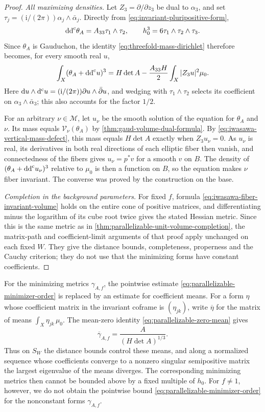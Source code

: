 \begin{proof}
\emph{All maximizing densities.}
Let $Z_3=\partial/\partial z_3$ be dual to $\alpha_3$, and set $\tau_j=(\mathrm i/(2\pi))\alpha_j\wedge\bar\alpha_j$. Directly from \eqref{eq:invariant-pluripositive-form},
\[
 \mathrm{dd}^{\mathrm{c}}\theta_A=A_{33}\tau_1\wedge\tau_2,
 \qquad h_0^3=6\tau_1\wedge\tau_2\wedge\tau_3.
\]
Since $\theta_A$ is Gauduchon, the identity \eqref{eq:threefold-mass-dirichlet} therefore becomes, for every smooth real $u$,
\begin{equation}\label{eq:iwasawa-vertical-mass-defect}
 \int_X(\theta_A+\mathrm{dd}^{\mathrm{c}} u)^3
   =H\det A-\frac{A_{33}H}{2}\int_X|Z_3u|^2\mu_0.
\end{equation}
Here $\mathrm du\wedge\mathrm d^{\mathrm c} u=(\mathrm i/(2\pi))\partial u\wedge\bar\partial u$, and wedging with $\tau_1\wedge\tau_2$ selects its coefficient on $\alpha_3\wedge\bar\alpha_3$; this also accounts for the factor $1/2$.

For an arbitrary $\nu\in\mathscr M$, let $u_\nu$ be the smooth solution of the equation for $\theta_A$ and $\nu$. Its mass equals $\mathcal V_\nu(\theta_A)$ by \cref{thm:gaud-volume-dual-formula}. By \eqref{eq:iwasawa-vertical-mass-defect}, this mass equals $H\det A$ exactly when $Z_3u_\nu=0$. As $u_\nu$ is real, its derivatives in both real directions of each elliptic fiber then vanish, and connectedness of the fibers gives $u_\nu=p^*v$ for a smooth $v$ on $B$. The density of $(\theta_A+\mathrm{dd}^{\mathrm{c}} u_\nu)^3$ relative to $\mu_0$ is then a function on $B$, so the equation makes $\nu$ fiber invariant. The converse was proved by the construction on the base.

\emph{Completion in the background parameters.}
For fixed $f$, formula \eqref{eq:iwasawa-fiber-invariant-volume} holds on the entire cone of positive matrices, and differentiating minus the logarithm of its cube root twice gives the stated Hessian metric. Since this is the same metric as in \cref{thm:parallelizable-unit-volume-completion}, the matrix-path and coefficient-limit arguments of that proof apply unchanged on each fixed $W$. They give the distance bounds, completeness, properness and the Cauchy criterion; they do not use that the minimizing forms have constant coefficients.
\end{proof}

For the minimizing metrics $\gamma_{A,f}$, the pointwise estimate \eqref{eq:parallelizable-minimizer-order} is replaced by an estimate for coefficient means. For a form $\eta$ whose coefficient matrix in the invariant coframe is $(\eta_{jk})$, write $\overline\eta$ for the matrix of means $\int_X\eta_{jk}\,\mu_0$. The mean-zero identity \eqref{eq:parallelizable-zero-mean} gives
\[
 \overline{\gamma}_{A,f}=\frac{A}{(H\det A)^{1/3}}.
\]
Thus on $S_W$ the distance bounds control these means, and along a normalized sequence whose coefficients converge to a nonzero singular semipositive matrix the largest eigenvalue of the means diverges. The corresponding minimizing metrics then cannot be bounded above by a fixed multiple of $h_0$. For $f\ne1$, however, we do not obtain the pointwise bound \eqref{eq:parallelizable-minimizer-order} for the nonconstant forms $\gamma_{A,f}$.

